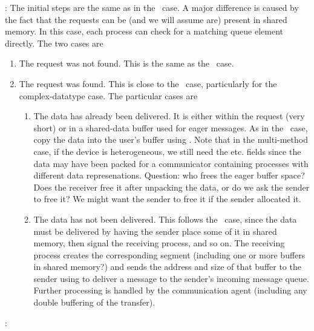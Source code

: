 \begin{mmadi}
\begin{shmem}
:
The initial steps are the same as in the \tcpname\ case.  A major difference
is caused by the fact that the requests can be (and we will assume are)
present in shared memory.  In this case, each process can check for a matching
queue element directly. The two cases are
\begin{enumerate}
\item The request was not found.  This is the same as the \tcpname\ case.
\item The request was found.  This is close to the \tcpname\ case,
  particularly for the complex-datatype case.  The particular cases are
  \begin{enumerate}
  \item The data has already been delivered.  It is either within the request
    (very short) or in a shared-data buffer used for eager messages.  As in
    the \tcpname\ case, copy the data into the user's buffer using
    .  Note that in the multi-method case, if the device
    is heterogeneous, we still need the  etc. fields
    since the data may have been packed for a communicator containing
    processes with different data represenations.
    Question: who frees the eager buffer space?  Does the receiver free it
    after unpacking the data, or do we ask the sender to free it?  We might
    want the sender to free it if the sender allocated it.

  \item The data has not been delivered.  This follows the \tcpname\ case,
    since the data must be delivered by having the sender place some of it in
    shared memory, then signal the receiving process, and so on.  The
    receiving process creates the corresponding segment (including one or more
    buffers in shared memory?) and sends the address and size of that buffer
    to the sender using  to deliver a message to the
    sender's incoming message queue.  Further processing is handled by the
    communication agent (including any double buffering of the transfer).
  \end{enumerate}
\end{enumerate}


:


\end{shmem}
\end{mmadi}
